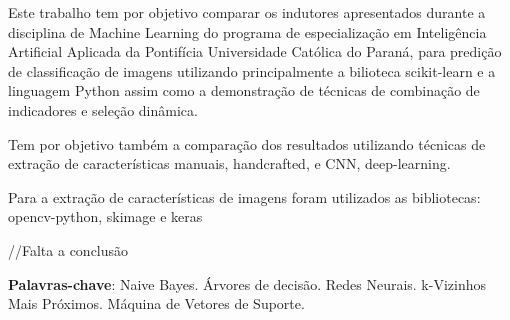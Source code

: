 \documentclass[
article,			%
11pt,				%
oneside,			%
a4paper,			%
english,			%
brazil,				%
sumario=tradicional
]{abntex2}
\begin{document}
	
	
	\frenchspacing 
	
	
	
	\maketitle
	
	
	
	
	
	\begin{resumoumacoluna}
		Este trabalho tem por objetivo comparar os indutores apresentados durante a disciplina de Machine Learning do programa de especialização em Inteligência Artificial Aplicada da Pontifícia Universidade Católica do Paraná, para predição de classificação de imagens utilizando principalmente a bilioteca scikit-learn e a linguagem Python assim como a demonstração de técnicas de combinação de indicadores e seleção dinâmica.

		Tem por objetivo também a comparação dos resultados utilizando técnicas de extração de características manuais, handcrafted, e CNN, deep-learning.

		Para a extração de características de imagens foram utilizados as bibliotecas: opencv-python, skimage e keras

		//Falta a conclusão
		
		\vspace{\onelineskip}
		
		\noindent
		\textbf{Palavras-chave}: Naive Bayes. Árvores de decisão. Redes Neurais. k-Vizinhos Mais Próximos. Máquina de Vetores de Suporte.
	\end{resumoumacoluna}
	
\end{document}
